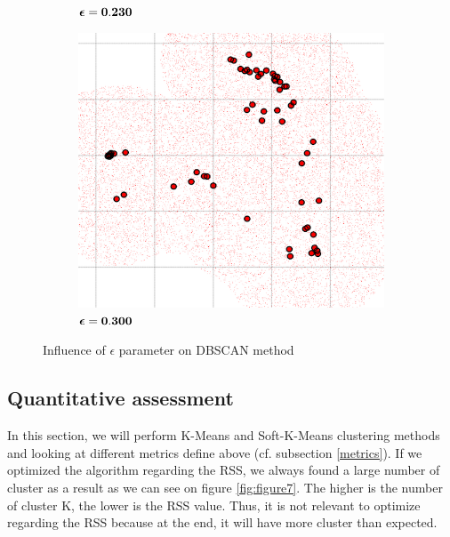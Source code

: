\begin{figure} [ht]
\begin{subfigure}[h]{0.30\textwidth}
	\caption{$\boldsymbol \epsilon \bf = 0.230$}
    \end{subfigure}
    \begin{subfigure}[h]{0.30\textwidth}
    \centering
    \includegraphics[height=0.18\textheight]{./clustering/dbs_scan_eps_0300_min_3.png}
	\caption{$\boldsymbol \epsilon \bf = 0.300$}
    \end{subfigure}

\caption{Influence of $\epsilon$ parameter on DBSCAN method}
\label{fig:figure6}
\end{figure}

\subsection{Quantitative assessment}

In this section, we will perform K-Means and Soft-K-Means clustering methods and looking at different metrics define above (cf. subsection \ref{metrics}). If we optimized the algorithm regarding the RSS, we always found a large number of cluster as a result as we can see on figure \ref{fig:figure7}. The higher is the number of cluster K, the lower is the RSS value. Thus, it is not relevant to optimize regarding the RSS because at the end, it will have more cluster than expected. 

